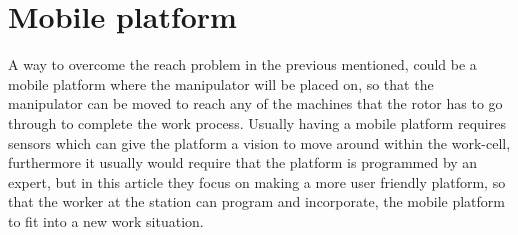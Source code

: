 \section{Mobile platform}
A way to overcome the reach problem in the previous mentioned, could be a mobile platform where the manipulator will be placed on, so that the manipulator can be moved to reach any of the machines that the rotor has to go through to complete the work process. Usually having a mobile platform requires sensors which can give the platform a vision to move around within the work-cell\cite{doi:10.1177/1729881417718588}, furthermore it usually would require that the platform is programmed by an expert, but in this article \cite{doi:10.1177/1729881417718588} they focus on making a more user friendly platform, so that the worker at the station can program and incorporate, the mobile platform to fit into a new work situation.\\
